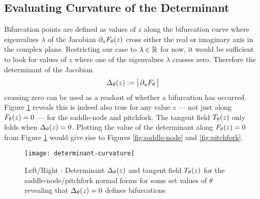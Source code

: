 \subsection{Evaluating Curvature of the Determinant}
Bifurcation points are defined as values of $z$ along the bifurcation curve where eigenvalues $\lambda$ of the Jacobian $\partial_u F_{\theta}(z)$ cross either the real or imaginary axis in the complex plane. Restricting our case to $\lambda\in\mathbb{R}$ for now, it would be sufficient to look for values of $z$ where one of the eigenvalues $\lambda$ crosses zero. Therefore the determinant of the Jacobian
\begin{align}
    \Delta_{\theta}(z) := \big|\,\partial_u F_{\theta}\,\big|
\end{align}
crossing zero can be used as a readout of whether a bifurcation has occurred. Figure \ref{fig:determinant-curvature} reveals this is indeed also true for any value $z$ --- not just along $F_{\theta}(z)=0$ --- for the saddle-node and pitchfork. The tangent field $T_{\theta}(z)$ only folds when $\Delta_{\theta}(z)=0$. Plotting the value of the determinant along $F_{\theta}(z)=0$ from Figure \ref{fig:determinant-curvature} would give rise to Figures \ref{fig:saddle-node} and \ref{fig:pitchfork}.

\begin{figure}[H]
\centering{}
\captionsetup{justification=centering}
\texttt{[image: determinant-curvature]}
\caption{Left/Right : Determinant $\Delta_{\theta}(z)$ and tangent field $T_{\theta}(z)$ for the saddle-node/pitchfork normal forms for some set values of $\theta$ revealing that $\Delta_{\theta}(z)=0$ defines bifurcations}
\label{fig:determinant-curvature}
\end{figure}

